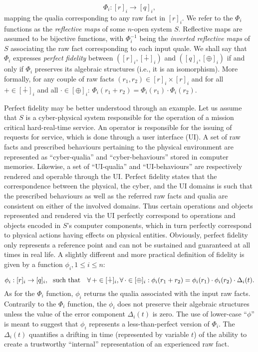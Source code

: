 \documentclass{article}
\begin{document}
\begin{equation}
\Phi_i : [r]_i \to [q]_i,\label{eq:Phi}
\end{equation}
mapping the qualia corresponding to any raw fact in $[r]_i$. We refer to the $\Phi_i$ functions as the \emph{reflective maps\/} of some $n$-open system $S$. Reflective maps are assumed to be bijective functions, with $\Phi^{-1}_i$ being the \emph{inverted reflective maps\/} of $S$ associating the raw fact corresponding to each input quale. We shall say that $\Phi_i$ expresses \emph{perfect fidelity\/} between $([r]_i, [\dotplus]_i)$ and $([q]_i, [\oplus]_i)$ if and only if $\Phi_i$
preserves its algebraic structures (i.e., it is an isomorphism). More formally, for any couple of raw facts $(r_1, r_2)\in [r]_i \times [r]_i$
and for all $\mathbb{+}\in[\dotplus]_i$ and all $\mathbb{\cdot}\in[\oplus]_i$:
\(
        \Phi_i(r_1    +   r_2) = \Phi_i(r_1)  \cdot  \Phi_i(r_2).\label{eq:HiFi}
\)

Perfect fidelity may be better understood through an example. Let us assume that $S$ is a cyber-physical system responsible for the operation of a mission critical hard-real-time service. An operator is responsible for the issuing of requests for service, which is done through a user interface (UI). A set of raw facts and prescribed behaviours pertaining to the physical environment are represented as ``cyber-qualia'' and ``cyber-behaviours'' stored in computer memories. Likewise, a set of ``UI-qualia'' and ``UI-behaviours'' are respectively rendered and operable through the UI. Perfect fidelity states that the correspondence between the physical, the cyber, and the UI domains is such that the prescribed behaviours as well as the referred raw facts and qualia are consistent on either of the involved domains. Thus certain operations and objects represented and rendered via the UI perfectly correspond to operations and objects encoded in $S$'s computer components, which in turn perfectly correspond to physical actions having effects on physical entities. Obviously, perfect fidelity only represents a reference point and can not be sustained and guaranteed at all times in real life. A slightly different and more practical definition of fidelity is given by a function $\phi_i, 1\le i\le n$:

\begin{equation}
\phi_i : [r]_i \to [q]_i, \ \ \hbox{such that} \ \ \ \forall \,+\in[\dotplus]_i, \forall \,\cdot\in[\oplus]_i:
        \phi_i(r_1    +  r_2) = \phi_i(r_1)  \cdot  \phi_i(r_2)  \cdot   \Delta_i(t).\label{eq:phi}
\end{equation}
As for the $\Phi_{i}$ function, $\phi_{i}$ returns the qualia associated with the input raw facts. Contrarily to the $\Phi_{i}$ function, the $\phi_i$ does not preserve
their algebraic structures unless the value of the error component $\Delta_i(t)$ is zero. The use of lower-case
``$\phi$'' is meant to suggest that $\phi_{i}$ represents a less-than-perfect version of $\Phi_{i}$.  The $\Delta_i(t)$ quantifies a drifting in time (represented
by variable $t$) of the ability to create a trustworthy ``internal'' representation of an experienced raw fact.
\end{document}
